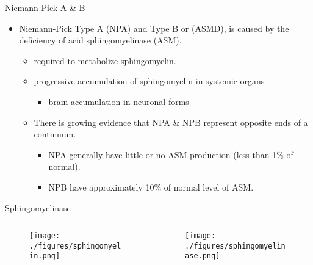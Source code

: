 \documentclass[presentation, smaller]{beamer}
\begin{document}
\begin{frame}[label={sec:orgheadline2}]{Niemann-Pick A \& B}
\begin{itemize}
\item Niemann-Pick Type A (NPA) and Type B or (ASMD), is caused by the deficiency of acid sphingomyelinase (ASM).
\begin{itemize}
\item required to metabolize sphingomyelin.
\item progressive accumulation of sphingomyelin in systemic organs
\begin{itemize}
\item brain accumulation in neuronal forms
\end{itemize}
\item There is growing evidence that NPA \& NPB represent opposite ends of a continuum.
\begin{itemize}
\item NPA generally have little or no ASM production (less than 1\% of normal).
\item NPB have approximately 10\% of normal level of ASM.
\end{itemize}
\end{itemize}
\end{itemize}
\end{frame}

\begin{frame}[label={sec:orgheadline3}]{Sphingomyelinase}
\begin{columns}
\begin{column}{0.5\columnwidth}
\begin{figure}[htb]
\centering
\texttt{[image: ./figures/sphingomyelin.png]}
\label{fig:}
\end{figure}
\end{column}

\begin{column}{0.5\columnwidth}
\begin{figure}[htb]
\centering
\texttt{[image: ./figures/sphingomyelinase.png]}
\label{fig:}
\end{figure}
\end{column}
\end{columns}
\end{frame}
\end{document}
